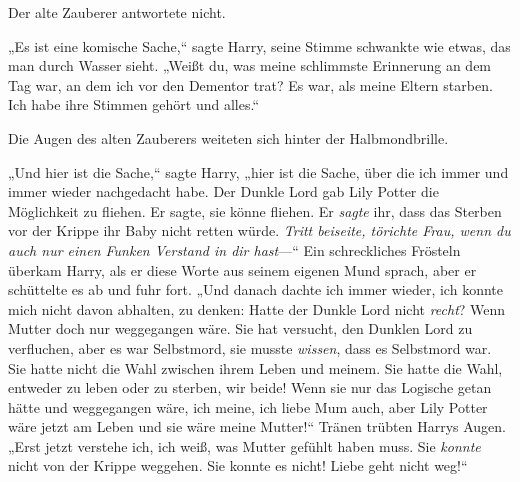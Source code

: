 Der alte Zauberer antwortete nicht.

„Es ist eine komische Sache,“ sagte Harry, seine Stimme schwankte wie etwas, das man durch Wasser sieht. „Weißt du, was meine schlimmste Erinnerung an dem Tag war, an dem ich vor den Dementor trat? Es war, als meine Eltern starben. Ich habe ihre Stimmen gehört und alles.“

Die Augen des alten Zauberers weiteten sich hinter der Halbmondbrille.

„Und hier ist die Sache,“ sagte Harry, „hier ist die Sache, über die ich immer und immer wieder nachgedacht habe. Der Dunkle Lord gab Lily Potter die Möglichkeit zu fliehen. Er sagte, sie könne fliehen. Er \emph{sagte} ihr, dass das Sterben vor der Krippe ihr Baby nicht retten würde. \emph{Tritt beiseite, törichte Frau, wenn du auch nur einen Funken Verstand in dir hast}—“
Ein schreckliches Frösteln überkam Harry, als er diese Worte aus seinem eigenen Mund sprach, aber er schüttelte es ab und fuhr fort.
„Und danach dachte ich immer wieder, ich konnte mich nicht davon abhalten, zu denken: Hatte der Dunkle Lord nicht \emph{recht}? Wenn Mutter doch nur weggegangen wäre. Sie hat versucht, den Dunklen Lord zu verfluchen, aber es war Selbstmord, sie musste \emph{wissen}, dass es Selbstmord war. Sie hatte nicht die Wahl zwischen ihrem Leben und meinem. Sie hatte die Wahl, entweder zu leben oder zu sterben, wir beide! Wenn sie nur das Logische getan hätte und weggegangen wäre, ich meine, ich liebe Mum auch, aber Lily Potter wäre jetzt am Leben und sie wäre meine Mutter!“
Tränen trübten Harrys Augen.
„Erst jetzt verstehe ich, ich weiß, was Mutter gefühlt haben muss. Sie \emph{konnte} nicht von der Krippe weggehen. Sie konnte es nicht! Liebe geht nicht weg!“

